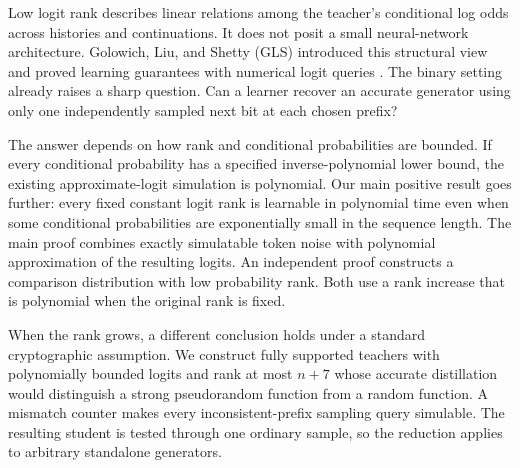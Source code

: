 \documentclass[11pt]{article}
\theoremstyle{definition}
\theoremstyle{remark}
\begin{document}
Low logit rank describes linear relations among the teacher's conditional log odds across histories and continuations. It does not posit a small neural-network architecture. Golowich, Liu, and Shetty (GLS) introduced this structural view and proved learning guarantees with numerical logit queries \citep{gls2,gls1}. The binary setting already raises a sharp question. Can a learner recover an accurate generator using only one independently sampled next bit at each chosen prefix?

The answer depends on how rank and conditional probabilities are bounded. If every conditional probability has a specified inverse-polynomial lower bound, the existing approximate-logit simulation is polynomial. Our main positive result goes further: every fixed constant logit rank is learnable in polynomial time even when some conditional probabilities are exponentially small in the sequence length. The main proof combines exactly simulatable token noise with polynomial approximation of the resulting logits. An independent proof constructs a comparison distribution with low probability rank. Both use a rank increase that is polynomial when the original rank is fixed.

When the rank grows, a different conclusion holds under a standard cryptographic assumption. We construct fully supported teachers with polynomially bounded logits and rank at most $n+7$ whose accurate distillation would distinguish a strong pseudorandom function from a random function. A mismatch counter makes every inconsistent-prefix sampling query simulable. The resulting student is tested through one ordinary sample, so the reduction applies to arbitrary standalone generators.
\end{document}
